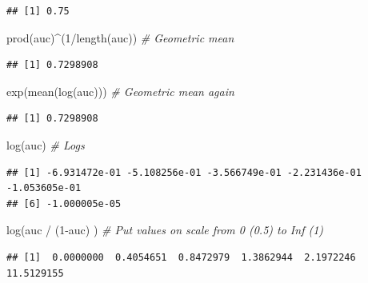 \documentclass[
]{book}
\newenvironment{Shaded}{\begin{snugshade}}{\end{snugshade}}
\newcommand{\CommentTok}[1]{\textcolor[rgb]{0.56,0.35,0.01}{\textit{#1}}}
\newcommand{\DecValTok}[1]{\textcolor[rgb]{0.00,0.00,0.81}{#1}}
\newcommand{\FunctionTok}[1]{\textcolor[rgb]{0.00,0.00,0.00}{#1}}
\newcommand{\NormalTok}[1]{#1}
\newcommand{\SpecialCharTok}[1]{\textcolor[rgb]{0.00,0.00,0.00}{#1}}
\begin{document}
\begin{verbatim}
## [1] 0.75
\end{verbatim}

\begin{Shaded}
\begin{Highlighting}[]
\FunctionTok{prod}\NormalTok{(auc)}\SpecialCharTok{\^{}}\NormalTok{(}\DecValTok{1}\SpecialCharTok{/}\FunctionTok{length}\NormalTok{(auc))       }\CommentTok{\# Geometric mean}
\end{Highlighting}
\end{Shaded}

\begin{verbatim}
## [1] 0.7298908
\end{verbatim}

\begin{Shaded}
\begin{Highlighting}[]
\FunctionTok{exp}\NormalTok{(}\FunctionTok{mean}\NormalTok{(}\FunctionTok{log}\NormalTok{(auc)))             }\CommentTok{\# Geometric mean again}
\end{Highlighting}
\end{Shaded}

\begin{verbatim}
## [1] 0.7298908
\end{verbatim}

\begin{Shaded}
\begin{Highlighting}[]
\FunctionTok{log}\NormalTok{(auc)                        }\CommentTok{\# Logs}
\end{Highlighting}
\end{Shaded}

\begin{verbatim}
## [1] -6.931472e-01 -5.108256e-01 -3.566749e-01 -2.231436e-01 -1.053605e-01
## [6] -1.000005e-05
\end{verbatim}

\begin{Shaded}
\begin{Highlighting}[]
\FunctionTok{log}\NormalTok{(auc }\SpecialCharTok{/}\NormalTok{ (}\DecValTok{1}\SpecialCharTok{{-}}\NormalTok{auc) )             }\CommentTok{\# Put values on scale from 0 (0.5) to Inf (1)}
\end{Highlighting}
\end{Shaded}

\begin{verbatim}
## [1]  0.0000000  0.4054651  0.8472979  1.3862944  2.1972246 11.5129155
\end{verbatim}
\end{document}
